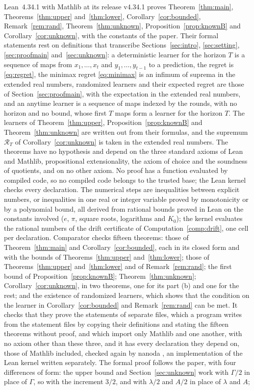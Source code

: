 \documentclass[12pt]{amsart}
\theoremstyle{definition}
\numberwithin{equation}{section}
\begin{document}
Lean~4.34.1 \citep{Lean4} with Mathlib \citep{Mathlib} at its release v4.34.1 proves Theorem~\ref{thm:main}, Theorems~\ref{thm:upper} and~\ref{thm:lower}, Corollary~\ref{cor:bounded}, Remark~\ref{rem:rand}, Theorem~\ref{thm:unknown}, Proposition~\ref{prop:knownB} and Corollary~\ref{cor:unknown}, with the constants of the paper. Their formal statements rest on definitions that transcribe Sections~\ref{sec:intro}, \ref{sec:setting}, \ref{sec:proofmain} and~\ref{sec:unknown}: a deterministic learner for the horizon $T$ is a sequence of maps from $x_1,\dots,x_t$ and $y_1,\dots,y_{t-1}$ to a prediction, the regret is \eqref{eq:regret}, the minimax regret \eqref{eq:minimax} is an infimum of suprema in the extended real numbers, randomized learners and their expected regret are those of Section~\ref{sec:proofmain}, with the expectation in the extended real numbers, and an anytime learner is a sequence of maps indexed by the rounds, with no horizon and no bound, whose first $T$ maps form a learner for the horizon $T$. The learners of Theorem~\ref{thm:upper}, Proposition~\ref{prop:knownB} and Theorem~\ref{thm:unknown} are written out from their formulas, and the supremum $\mathcal R_T$ of Corollary~\ref{cor:unknown} is taken in the extended real numbers. The theorems have no hypothesis and depend on the three standard axioms of Lean and Mathlib, propositional extensionality, the axiom of choice and the soundness of quotients, and on no other axiom. No proof has a function evaluated by compiled code, so no compiled code belongs to the trusted base; the Lean kernel checks every declaration. The numerical steps are inequalities between explicit numbers, or inequalities in one real or integer variable proved by monotonicity or by a polynomial bound, all derived from rational bounds proved in Lean on the constants involved ($e$, $\pi$, square roots, logarithms and $K_0$); the kernel evaluates the rational numbers of the drift certificate of Computation~\ref{comp:drift}, one cell per declaration. Comparator \citep{Comparator} checks fifteen theorems: those of Theorem~\ref{thm:main} and Corollary~\ref{cor:bounded}, each in its closed form and with the bounds of Theorems~\ref{thm:upper} and~\ref{thm:lower}; those of Theorems~\ref{thm:upper} and~\ref{thm:lower} and of Remark~\ref{rem:rand}; the first bound of Proposition~\ref{prop:knownB}; Theorem~\ref{thm:unknown}; Corollary~\ref{cor:unknown}, in two theorems, one for its part (b) and one for the rest; and the existence of randomized learners, which shows that the condition on the learner in Corollary~\ref{cor:bounded} and Remark~\ref{rem:rand} can be met. It checks that they prove the statements of separate files, which a program writes from the statement files by copying their definitions and stating the fifteen theorems without proof, and which import only Mathlib and one another, with no axiom other than these three, and it has every declaration they depend on, those of Mathlib included, checked again by nanoda \citep{nanoda}, an implementation of the Lean kernel written separately. The formal proof follows the paper, with four differences of form: the upper bound and Section~\ref{sec:unknown} work with $\Gamma/2$ in place of $\Gamma$, so with the increment $3/2$, and with $\lambda/2$ and $A/2$ in place of $\lambda$ and $A$; 
\end{document}
